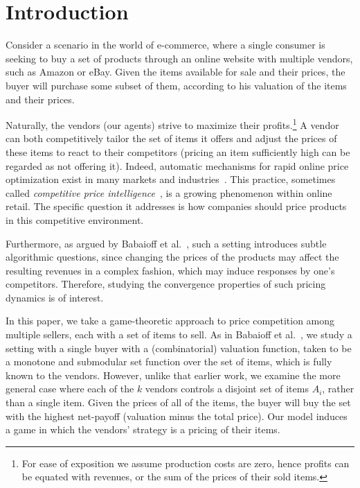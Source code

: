 \section{Introduction}
Consider a scenario in the world of e-commerce, where a single
consumer is seeking to buy a set of products through an online website with
multiple vendors, such as Amazon or eBay. Given the items available
for sale and their prices, the buyer will purchase some subset
of them, according to his valuation of the items and their prices.

Naturally, the vendors (our agents) strive to
maximize their profits.\footnote{For ease of exposition we assume
production costs are zero, hence profits can be equated with
revenues, or the sum of the prices of their
sold items.}
A vendor can both competitively tailor the set
of items it offers and adjust
the prices of these items to react to their competitors (pricing an item sufficiently high can be
regarded as not offering it). 
Indeed, automatic mechanisms for rapid online price optimization 
exist in many markets and
industries~\cite{angwin2012coming}. This practice,
sometimes called \emph{competitive price intelligence}~\cite{skorupa14},
is a growing phenomenon within online retail. The specific
question it addresses is how companies should price products
in this competitive environment. %

Furthermore, as argued by Babaioff et al.~\citeyear{BabaioffNL14}, such a
setting introduces subtle algorithmic questions, since changing the
prices of the products may affect the resulting revenues in a
complex fashion, which may induce responses by one's
competitors. Therefore, studying the convergence properties of such
pricing dynamics is of interest.

In this paper, we take a game-theoretic approach to price competition
among multiple sellers, each with a set of items to sell. As in
Babaioff et al.~\citeyear{BabaioffNL14}, we study a setting with a single
buyer with a (combinatorial) valuation function, taken to be a
monotone and submodular set function over the set of items, which is fully known to the vendors. However, unlike that earlier
work, we examine the more general case where each of the $k$ vendors
controls a disjoint set of items $A_i$, rather than a single item. Given the prices of all of the
items, the buyer will buy the set with the highest net-payoff
(valuation minus the total price). Our model induces a game
in which the vendors' strategy is a pricing of their
items.%

